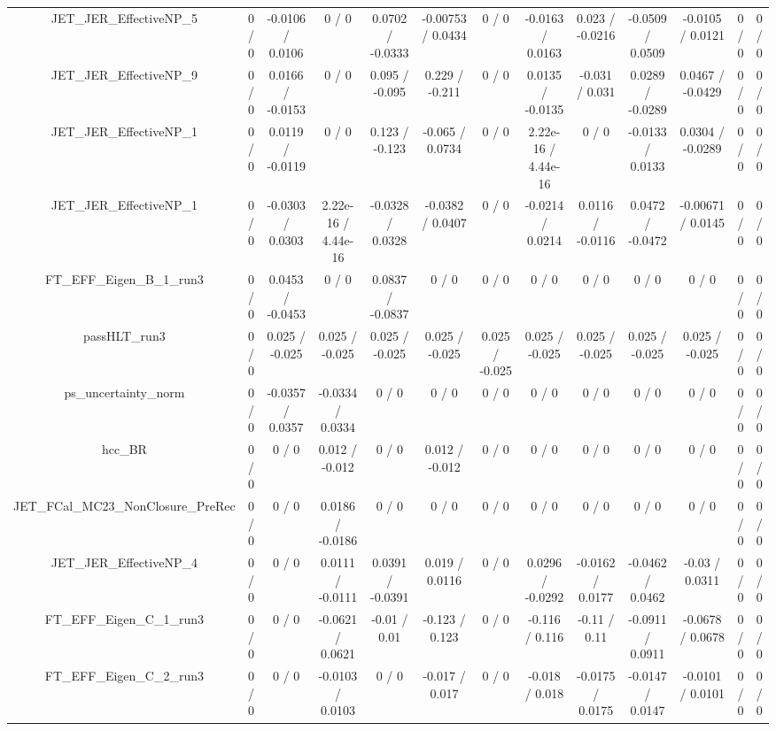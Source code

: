 \documentclass[10pt]{article}
\begin{document}
\begin{table}[htbp]
\begin{center}
\begin{tabular}{|c|c|c|c|c|c|c|c|c|c|c|c|c|}
  JET_JER_EffectiveNP_5 & 0 / 0 & -0.0106 / 0.0106 & 0 / 0 & 0.0702 / -0.0333 & -0.00753 / 0.0434 & 0 / 0 & -0.0163 / 0.0163 & 0.023 / -0.0216 & -0.0509 / 0.0509 & -0.0105 / 0.0121 & 0 / 0 & 0 / 0 \\ 
  JET_JER_EffectiveNP_9 & 0 / 0 & 0.0166 / -0.0153 & 0 / 0 & 0.095 / -0.095 & 0.229 / -0.211 & 0 / 0 & 0.0135 / -0.0135 & -0.031 / 0.031 & 0.0289 / -0.0289 & 0.0467 / -0.0429 & 0 / 0 & 0 / 0 \\ 
  JET_JER_EffectiveNP_1 & 0 / 0 & 0.0119 / -0.0119 & 0 / 0 & 0.123 / -0.123 & -0.065 / 0.0734 & 0 / 0 & 2.22e-16 / 4.44e-16 & 0 / 0 & -0.0133 / 0.0133 & 0.0304 / -0.0289 & 0 / 0 & 0 / 0 \\ 
  JET_JER_EffectiveNP_1 & 0 / 0 & -0.0303 / 0.0303 & 2.22e-16 / 4.44e-16 & -0.0328 / 0.0328 & -0.0382 / 0.0407 & 0 / 0 & -0.0214 / 0.0214 & 0.0116 / -0.0116 & 0.0472 / -0.0472 & -0.00671 / 0.0145 & 0 / 0 & 0 / 0 \\ 
  FT_EFF_Eigen_B_1_run3 & 0 / 0 & 0.0453 / -0.0453 & 0 / 0 & 0.0837 / -0.0837 & 0 / 0 & 0 / 0 & 0 / 0 & 0 / 0 & 0 / 0 & 0 / 0 & 0 / 0 & 0 / 0 \\ 
  passHLT_run3 & 0 / 0 & 0.025 / -0.025 & 0.025 / -0.025 & 0.025 / -0.025 & 0.025 / -0.025 & 0.025 / -0.025 & 0.025 / -0.025 & 0.025 / -0.025 & 0.025 / -0.025 & 0.025 / -0.025 & 0 / 0 & 0 / 0 \\ 
  ps_uncertainty_norm & 0 / 0 & -0.0357 / 0.0357 & -0.0334 / 0.0334 & 0 / 0 & 0 / 0 & 0 / 0 & 0 / 0 & 0 / 0 & 0 / 0 & 0 / 0 & 0 / 0 & 0 / 0 \\ 
  hcc_BR & 0 / 0 & 0 / 0 & 0.012 / -0.012 & 0 / 0 & 0.012 / -0.012 & 0 / 0 & 0 / 0 & 0 / 0 & 0 / 0 & 0 / 0 & 0 / 0 & 0 / 0 \\ 
  JET_FCal_MC23_NonClosure_PreRec & 0 / 0 & 0 / 0 & 0.0186 / -0.0186 & 0 / 0 & 0 / 0 & 0 / 0 & 0 / 0 & 0 / 0 & 0 / 0 & 0 / 0 & 0 / 0 & 0 / 0 \\ 
  JET_JER_EffectiveNP_4 & 0 / 0 & 0 / 0 & 0.0111 / -0.0111 & 0.0391 / -0.0391 & 0.019 / 0.0116 & 0 / 0 & 0.0296 / -0.0292 & -0.0162 / 0.0177 & -0.0462 / 0.0462 & -0.03 / 0.0311 & 0 / 0 & 0 / 0 \\ 
  FT_EFF_Eigen_C_1_run3 & 0 / 0 & 0 / 0 & -0.0621 / 0.0621 & -0.01 / 0.01 & -0.123 / 0.123 & 0 / 0 & -0.116 / 0.116 & -0.11 / 0.11 & -0.0911 / 0.0911 & -0.0678 / 0.0678 & 0 / 0 & 0 / 0 \\ 
  FT_EFF_Eigen_C_2_run3 & 0 / 0 & 0 / 0 & -0.0103 / 0.0103 & 0 / 0 & -0.017 / 0.017 & 0 / 0 & -0.018 / 0.018 & -0.0175 / 0.0175 & -0.0147 / 0.0147 & -0.0101 / 0.0101 & 0 / 0 & 0 / 0 \\ 

\end{tabular}
\end{center}
\end{table}
\end{document}
